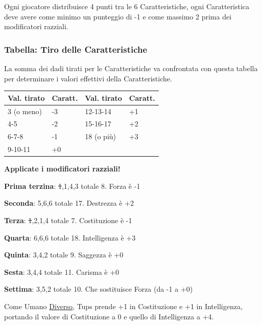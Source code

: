\begin{multicols}{2}
Ogni giocatore distribuisce 4 punti tra le 6 Caratteristiche, ogni Caratteristica deve avere come minimo un punteggio di -1 e come massimo 2 prima dei modificatori razziali.

\subsubsection{Tabella: Tiro delle Caratteristiche}

La somma dei dadi tirati per le Caratteristiche va confrontata con questa tabella per determinare i valori effettivi della Caratteristiche.

\medskip

\noindent\begin{tabularx}{\linewidth}{ll|ll}
\toprule
\rowcolor{gray!20}\textbf{Val. tirato} & \textbf{Caratt.} & \textbf{Val. tirato} & \textbf{Caratt.}\\
\toprule
3 (o meno)	&	-3	&	12-13-14	&	+1\\
\rowcolor{gray!20}4-5			&	-2	&	15-16-17	&	+2\\
6-7-8		&	-1	&	18 (o più)	&+3\\
\rowcolor{gray!20}9-10-11		&	+0	&	&\\
\end{tabularx}

\medskip

\textbf{Applicate i modificatori razziali!}

\medskip

\begin{giocatore}
		\textbf{Prima terzina}: \st{1},1,4,3 totale 8. Forza è -1

		\textbf{Seconda}: 5,6,6 totale 17. Destrezza è +2

		\textbf{Terza}: \st{1},2,1,4 totale 7. Costituzione è -1

		\textbf{Quarta}: 6,6,6 totale 18. Intelligenza è +3

		\textbf{Quinta}: 3,4,2 totale 9. Saggezza è +0

		\textbf{Sesta}: 3,4,4 totale 11. Carisma è +0

		\textbf{Settima}: 3,5,2 totale 10. Che sostituisce Forza (da -1 a +0)

		Come Umano \hyperlink{diverso}{Diverso}, Tups prende +1 in Costituzione e +1 in Intelligenza, portando il valore di Costituzione a 0 e quello di Intelligenza a +4.

\end{giocatore}


\end{multicols}
